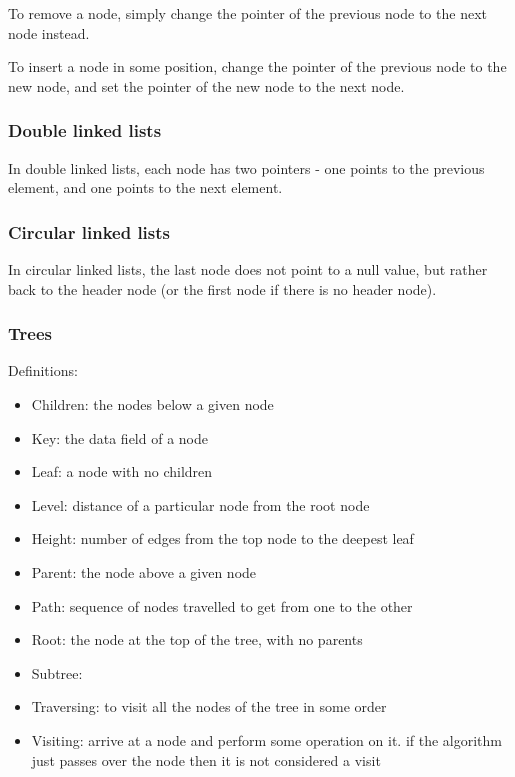 \documentclass{article}
\begin{document}
To remove a node, simply change the pointer of the previous node to the next
node instead.

To insert a node in some position, change the pointer of the previous node to
the new node, and set the pointer of the new node to the next node.

\subsubsection{Double linked lists}

In double linked lists, each node has two pointers - one points to the previous
element, and one points to the next element.

\subsubsection{Circular linked lists}

In circular linked lists, the last node does not point to a null value, but
rather back to the header node (or the first node if there is no header node).

\subsubsection{Trees}

Definitions:
\begin{itemize}
    \item Children: the nodes below a given node
    \item Key: the data field of a node
    \item Leaf: a node with no children
    \item Level: distance of a particular node from the root node
    \item Height: number of edges from the top node to the deepest leaf
    \item Parent: the node above a given node
    \item Path: sequence of nodes travelled to get from one to the other
    \item Root: the node at the top of the tree, with no parents
    \item Subtree:
    \item Traversing: to visit all the nodes of the tree in some order
    \item Visiting: arrive at a node and perform some operation on it. if the
        algorithm just passes over the node then it is not considered a visit
\end{itemize}
\end{document}
